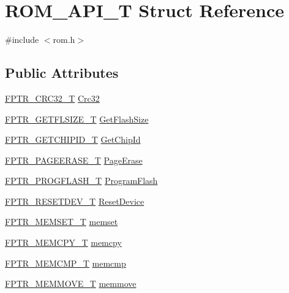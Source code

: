 \hypertarget{struct_r_o_m___a_p_i___t}{}\section{R\+O\+M\+\_\+\+A\+P\+I\+\_\+T Struct Reference}
\label{struct_r_o_m___a_p_i___t}


{\ttfamily \#include $<$rom.\+h$>$}

\subsection*{Public Attributes}
\begin{DoxyCompactItemize}
\item 
\hyperlink{rom_8h_a0a1438f012c69a26fb6532107eccf101}{F\+P\+T\+R\+\_\+\+C\+R\+C32\+\_\+T} \hyperlink{struct_r_o_m___a_p_i___t_a91d49a9c55a7b5d10361aca6cb94d704}{Crc32}
\item 
\hyperlink{rom_8h_abb2b831ef4f4e91d45d4ec7754a24f41}{F\+P\+T\+R\+\_\+\+G\+E\+T\+F\+L\+S\+I\+Z\+E\+\_\+T} \hyperlink{struct_r_o_m___a_p_i___t_ab95dee37617df708f8cbd432246a9782}{Get\+Flash\+Size}
\item 
\hyperlink{rom_8h_a41c2933f8518f285a725de37052d0485}{F\+P\+T\+R\+\_\+\+G\+E\+T\+C\+H\+I\+P\+I\+D\+\_\+T} \hyperlink{struct_r_o_m___a_p_i___t_a3f6ccfd898f1b48c225da2ca1627cff3}{Get\+Chip\+Id}
\item 
\hyperlink{rom_8h_a01508d5c062a210e5222ceea414008b7}{F\+P\+T\+R\+\_\+\+P\+A\+G\+E\+E\+R\+A\+S\+E\+\_\+T} \hyperlink{struct_r_o_m___a_p_i___t_af70c2fb4c80efffcbb27163768ebd22b}{Page\+Erase}
\item 
\hyperlink{rom_8h_ac1b9d928febe5572578880495d70246a}{F\+P\+T\+R\+\_\+\+P\+R\+O\+G\+F\+L\+A\+S\+H\+\_\+T} \hyperlink{struct_r_o_m___a_p_i___t_a9500acfc05232498a409e64fa7fa7836}{Program\+Flash}
\item 
\hyperlink{rom_8h_a0c1db0ae8fd4fbc2d4985e1186128289}{F\+P\+T\+R\+\_\+\+R\+E\+S\+E\+T\+D\+E\+V\+\_\+T} \hyperlink{struct_r_o_m___a_p_i___t_a92aca0d3f70969de09c8a0c9599e3931}{Reset\+Device}
\item 
\hyperlink{rom_8h_ae7de4f4601c754a44a07a70799b1b68d}{F\+P\+T\+R\+\_\+\+M\+E\+M\+S\+E\+T\+\_\+T} \hyperlink{struct_r_o_m___a_p_i___t_a0d5a489d6da49b1ef78a164e39090595}{memset}
\item 
\hyperlink{rom_8h_a3b1fd77e9cbe459d95b2ef9e4d6f55d6}{F\+P\+T\+R\+\_\+\+M\+E\+M\+C\+P\+Y\+\_\+T} \hyperlink{struct_r_o_m___a_p_i___t_a7865642cadb66c2a741f43bc1b3f3eb9}{memcpy}
\item 
\hyperlink{rom_8h_a7709341133e75c6ca9542ed2a6e3a818}{F\+P\+T\+R\+\_\+\+M\+E\+M\+C\+M\+P\+\_\+T} \hyperlink{struct_r_o_m___a_p_i___t_a3a092b418e970bab44de3e28e271f351}{memcmp}
\item 
\hyperlink{rom_8h_a7e33ff00c76926b13910079fabf278cb}{F\+P\+T\+R\+\_\+\+M\+E\+M\+M\+O\+V\+E\+\_\+T} \hyperlink{struct_r_o_m___a_p_i___t_ac8a372d7f1ab48897e89075e9d4882b4}{memmove}
\end{DoxyCompactItemize}


